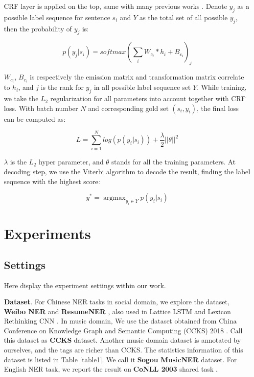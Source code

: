 \documentclass[letterpaper]{article} %
\begin{document}
CRF layer is applied on the top, same with many previous works \cite{nlp,char-fea1,mahovy,comb,lattice,lrcnn}. Denote $y_j$ as a possible label sequence for sentence $s_i$ and $Y$ as the total set of all possible $y_j$, then the probability of $y_j$ is:

\begin{equation}
p(y_j | s_i) = softmax(\sum_i{W_{c_i} * h_i} + B_{c_i})_j
\label{crf_probability}
\end{equation}

$W_{c_i}$, $B_{c_i}$ is respectively the emission matrix and transformation matrix correlate to $h_i$, and $j$ is the rank for $y_j$ in all possible label sequence set $Y$.  While training, we take the $L_2$ regularization for all parameters into account together with CRF loss. With batch number $N$ and corresponding gold set $(s_i, y_i)$, the final loss can be computed as:

\begin{equation}
L = \sum_{i=1}^{N}{log(p(y_i | s_i))} + \frac{\lambda}{2}{|| \theta ||}^2
\label{crf_probability}
\end{equation}

$\lambda$ is the $L_2$ hyper parameter, and $\theta$ stands for all the training parameters. At decoding step, we use the Viterbi algorithm \cite{viterbi} to decode the result, finding the label sequence with the highest score: 

\begin{equation}
y^* = \mathop{\arg\max}_{y_i \in Y}{p(y_i | s_i)}
\label{crf_decode}
\end{equation}




\section{Experiments}

\subsection{Settings}

Here display the experiment settings within our work.

\textbf{Dataset}. For Chinese NER tasks in social domain, we explore the dataset, \textbf{Weibo NER} \cite{peng15,hesun16} and \textbf{ResumeNER} \cite{lattice}, also used in Lattice LSTM \cite{lattice} and Lexicon Rethinking CNN \cite{lrcnn}. In music domain, We use the dataset obtained from China Conference on Knowledge Graph and Semantic Computing (CCKS) 2018 \cite{ccks}. Call this dataset as \textbf{CCKS} dataset. Another music domain dataset is annotated by ourselves, and the tags are richer than CCKS. The statistics information of this dataset is listed in Table \ref{table1}. We call it \textbf{Sogou MusicNER} dataset. For English NER task, we report the result on \textbf{CoNLL 2003} shared task \cite{conll}.
\end{document}
